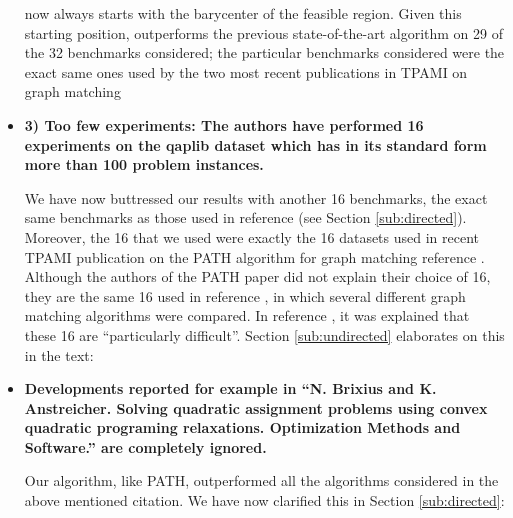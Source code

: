 \begin{itemize}
	
	\FAQ now always starts with the barycenter of the feasible region. Given this starting position, \FAQ outperforms the previous state-of-the-art algorithm on 29 of the 32 benchmarks considered; the particular benchmarks considered were the exact same ones used by the two most recent publications in TPAMI on graph matching \cite{Zaslavskiy2009,Liu2012}


	\item \textbf{3) Too few experiments:
	The authors have performed 16 experiments on
	the qaplib dataset which has in its standard form
	more than 100 problem instances.
	}

	We have now buttressed our results with another 16 benchmarks, the exact same benchmarks as those used in reference \cite{Liu2012} (see Section \ref{sub:directed}).  Moreover, the 16 that we used were exactly the 16 datasets used in recent TPAMI publication on the PATH algorithm for graph matching reference \cite{Zaslavskiy2009}.  Although the authors of the PATH paper did not explain their choice of 16, they are the same 16 used in reference \cite{Schellewald2001}, in which several different graph matching algorithms were compared.  In reference \cite{Schellewald2001}, it was explained that these 16 are ``particularly difficult''.  Section \ref{sub:undirected} elaborates on this in the text:
	
	
	\item \textbf{Developments reported for example in
``N. Brixius and K. Anstreicher. Solving quadratic assignment problems
using convex quadratic programing relaxations. Optimization Methods
and Software.'' are completely ignored.
}


Our algorithm, like PATH, outperformed all the algorithms considered in the above mentioned citation.  We have now clarified this in Section \ref{sub:directed}:



\end{itemize}
